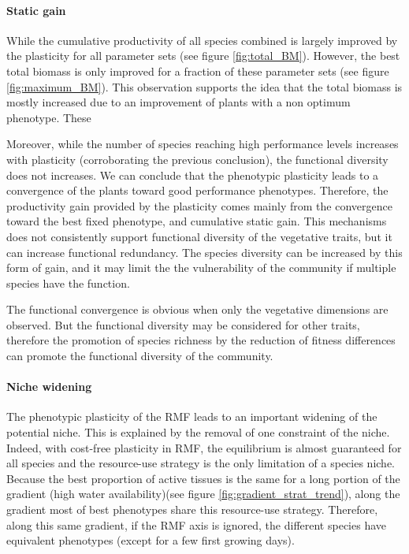 \paragraph{Static gain}

While the cumulative productivity of all species combined is largely improved by the plasticity for all parameter sets (see figure \ref{fig:total_BM}). However, the best total biomass is only improved for a fraction of these parameter sets (see figure \ref{fig:maximum_BM}). This observation supports the idea that the total biomass is mostly increased due to an improvement of plants with a non optimum phenotype. These 

Moreover, while the number of species reaching high performance levels increases with plasticity (corroborating the previous conclusion), the functional diversity does not increases. We can conclude that the phenotypic plasticity leads to a convergence of the plants toward good performance phenotypes. Therefore, the productivity gain provided by the plasticity comes mainly from the convergence toward the best fixed phenotype, and cumulative static gain. This mechanisms does not consistently support functional diversity of the vegetative traits, but it can increase functional redundancy. The species diversity can be increased by this form of gain, and it may limit the the vulnerability of the community if multiple species have the function.

The functional convergence is obvious when only the vegetative dimensions are observed. But the functional diversity may be considered for other traits, therefore the promotion of species richness by the reduction of fitness differences can promote the functional diversity of the community. 


\paragraph{Niche widening}

The phenotypic plasticity of the RMF leads to an important widening of the potential niche. This is explained by the removal of one constraint of the niche. Indeed, with cost-free plasticity in RMF, the equilibrium is almost guaranteed for all species and the resource-use strategy is the only limitation of a species niche. Because the best proportion of active tissues is the same for a long portion of the gradient (high water availability)(see figure \ref{fig:gradient_strat_trend}), along the gradient most of best phenotypes share this resource-use strategy. Therefore, along this same gradient, if the RMF axis is ignored, the different species have equivalent phenotypes (except for a few first growing  days).

